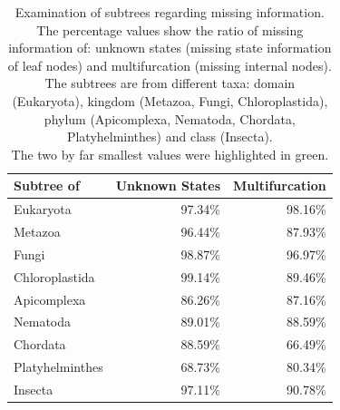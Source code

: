     \begin{table}[h!]
      \begin{center}
        \begin{tabular}{ |l||r|r| }
          \hline
          \bfseries Subtree of & \bfseries Unknown States & \bfseries Multifurcation \\ 
          \hline \hline
          Eukaryota       & 97.34\%  & 98.16\% \\
          \hline \hline
          Metazoa         & 96.44\%  & 87.93\% \\ \hline
          Fungi           & 98.87\%  & 96.97\% \\ \hline
          Chloroplastida  & 99.14\%  & 89.46\% \\
          \hline \hline            
          Apicomplexa     & 86.26\%  & 87.16\% \\ \hline
          Nematoda        & 89.01\%  & 88.59\% \\ \hline
          Chordata        & 88.59\%  & \cellcolor{green!50}66.49\% \\ \hline
          Platyhelminthes & \cellcolor{green!50}68.73\%  & 80.34\% \\
          \hline \hline            
          Insecta         & 97.11\%  & 90.78\% \\
          \hline  
        \end{tabular}
      \end{center}
      \caption{Examination of subtrees regarding missing information. \\
        The percentage values show the ratio of missing information of: unknown states (missing state 
          information of leaf nodes) and multifurcation (missing internal nodes). \\
        The subtrees are from different taxa: domain (Eukaryota), kingdom (Metazoa, Fungi, 
          Chloroplastida), phylum (Apicomplexa, Nematoda, Chordata, Platyhelminthes) and class 
          (Insecta). \\
        The two by far smallest values were highlighted in green.} 
      \label{table:percentage loss information subtrees} 
    \end{table}
    

